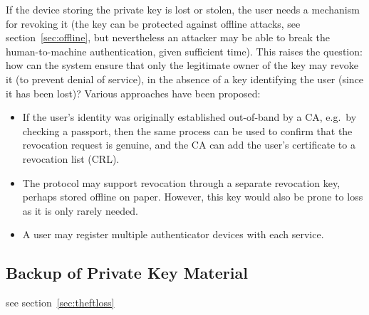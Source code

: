 If the device storing the private key is lost or stolen, the user needs a mechanism for revoking it
(the key can be protected against offline attacks, see section~\ref{sec:offline}, but nevertheless
an attacker may be able to break the human-to-machine authentication, given sufficient time). This
raises the question: how can the system ensure that only the legitimate owner of the key may revoke
it (to prevent denial of service), in the absence of a key identifying the user (since it has been
lost)? Various approaches have been proposed:

\begin{itemize}
\item If the user's identity was originally established out-of-band by a CA, e.g.\ by checking a
passport, then the same process can be used to confirm that the revocation request is genuine, and
the CA can add the user's certificate to a revocation list (CRL).
\item The protocol may support revocation through a separate revocation key, perhaps stored offline
on paper. However, this key would also be prone to loss as it is only rarely needed.
\item A user may register multiple authenticator devices with each service. 
\end{itemize}

\subsection{Backup of Private Key Material}\label{sec:backup}

see section~\ref{sec:theftloss}
